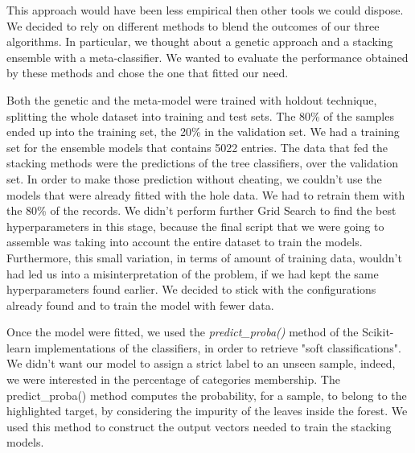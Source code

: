 This approach would have been less empirical then other tools we could dispose. We decided to rely on different methods to blend the outcomes of our three algorithms. In particular, we thought about a genetic approach and a stacking ensemble with a meta-classifier. 
We wanted to evaluate the performance obtained by these methods and chose the one that fitted our need.

Both the genetic and the meta-model were trained with holdout technique, splitting the whole dataset into training and test sets. The 80\% of the samples ended up into the training set, the 20\% in the validation set.
We had a training set for the ensemble models that contains 5022 entries.
The data that fed the stacking methods were the predictions of the tree classifiers, over the validation set.
In order to make those prediction without cheating, we couldn't use the models that were already fitted with the hole data. We had to retrain them with the 80\% of the records. 
We didn't perform further Grid Search to find the best hyperparameters in this stage, because the final script that we were going to assemble was taking into account the entire dataset to train the models. Furthermore, this small variation, in terms of amount of training data, wouldn't had led us into a misinterpretation of the problem, if we had kept the same hyperparameters found earlier.
We decided to stick with the configurations already found and to train the model with fewer data.

Once the model were fitted, we used the \textit{predict\_proba()} method of the Scikit-learn implementations of the classifiers, in order to retrieve "soft classifications".
We didn't want our model to assign a strict label to an unseen sample, indeed, we were interested in the percentage of categories membership.
The predict\_proba() method computes the probability, for a sample, to belong to the highlighted target, by considering the impurity of the leaves inside the forest.
We used this method to construct the output vectors needed to train the stacking models.


